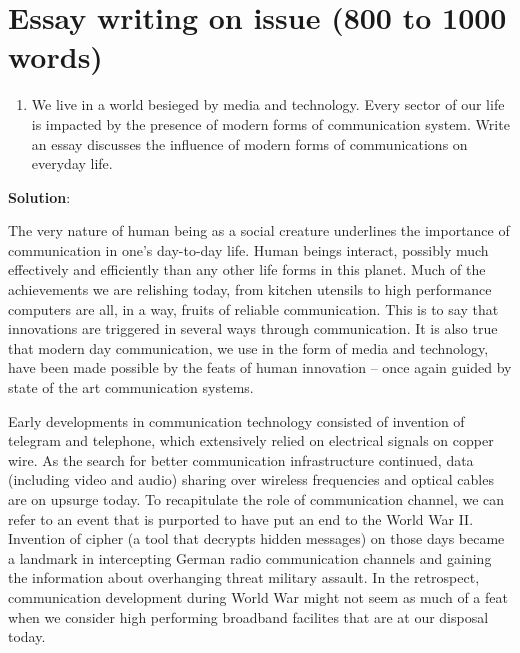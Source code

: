 \documentclass[
  openany]{book}
\providecommand{\tightlist}{%
  \setlength{\itemsep}{0pt}\setlength{\parskip}{0pt}}
\newenvironment{solution}{ {\bfseries Solution}:}{}
\begin{document}
\hypertarget{essay-writing-on-issue-800-to-1000-words}{%
\section{Essay writing on issue (800 to 1000 words)}\label{essay-writing-on-issue-800-to-1000-words}}

\begin{enumerate}
\def\labelenumi{\arabic{enumi}.}
\tightlist
\item
  We live in a world besieged by media and technology. Every sector of our life is impacted by the presence of modern forms of communication system. Write an essay discusses the influence of modern forms of communications on everyday life.
\end{enumerate}

\begin{solution}

The very nature of human being as a social creature underlines the importance of communication in one's day-to-day life. Human beings interact, possibly much effectively and efficiently than any other life forms in this planet. Much of the achievements we are relishing today, from kitchen utensils to high performance computers are all, in a way, fruits of reliable communication. This is to say that innovations are triggered in several ways through communication. It is also true that modern day communication, we use in the form of media and technology, have been made possible by the feats of human innovation -- once again guided by state of the art communication systems.

Early developments in communication technology consisted of invention of telegram and telephone, which extensively relied on electrical signals on copper wire. As the search for better communication infrastructure continued, data (including video and audio) sharing over wireless frequencies and optical cables are on upsurge today. To recapitulate the role of communication channel, we can refer to an event that is purported to have put an end to the World War II. Invention of cipher (a tool that decrypts hidden messages) on those days became a landmark in intercepting German radio communication channels and gaining the information about overhanging threat military assault. In the retrospect, communication development during World War might not seem as much of a feat when we consider high performing broadband facilites that are at our disposal today.


\end{solution}
\end{document}
